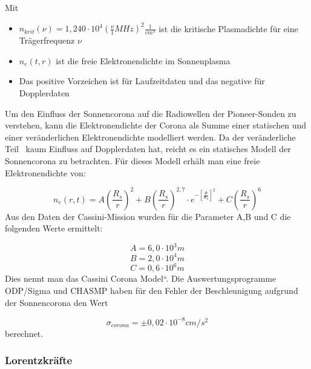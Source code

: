 Mit
\begin{itemize}
\item $n_{\mathit{krit}}(\nu )=1,240\cdot 10^{4}(\frac{\nu
}{1}\mathit{MHz})^{2}\frac{1}{\mathit{cm}^{3}}$ ist die kritische
Plasmadichte f\"ur eine Tr\"agerfrequenz $\nu $

\item $n_{e}(t,r)$ ist die freie Elektronendichte im Sonnenplasma
\item Das positive Vorzeichen ist f\"ur Laufzeitdaten und das negative
f\"ur Dopplerdaten
\end{itemize}

Um den Einfluss der Sonnencorona auf die Radiowellen der
Pioneer-Sonden zu verstehen, kann die Elektronendichte der Corona als
Summe einer statischen und einer ver\"anderlichen Elektronendichte
modelliert werden. Da der ver\"anderliche Teil \ kaum Einfluss auf
Dopplerdaten hat\cite{Anderson2002}, reicht es ein statisches Modell der Sonnencorona
zu betrachten. F\"ur dieses Modell erh\"alt man eine freie
Elektronendichte von\cite{Anderson2002}:

\begin{equation}
n_{e}(r,t)=A(\frac{R_{s}}{r})^{2}+B(\frac{R_{s}}{r})^{2,7}\cdot
e^{-[\frac{\Phi }{\Phi _{0}}]^{2}}+C(\frac{R_{s}}{r})^{6}
\end{equation}
Aus den Daten der Cassini-Mission wurden f\"ur die Parameter A,B und C die
folgenden Werte ermittelt:

\begin{equation*}
A=6,0\cdot 10^{3}m
\end{equation*}
\begin{equation*}
B=2,0\cdot 10^{4}m
\end{equation*}
\begin{equation*}
C=0,6\cdot 10^{6}m
\end{equation*}
Dies nennt man das {\quotedblbase}Cassini Corona Model``. Die
Auswertungsprogramme ODP/Sigma und CHASMP haben f\"ur den Fehler der Beschleunigung aufgrund der Sonnencorona den
Wert

\begin{equation}
\sigma _{\mathit{corona}}=\pm 0,02\cdot
10^{-8}\mathit{cm}/s^{2}
\end{equation}
berechnet\cite{Anderson2002}.


\bigskip

\subsubsection{Lorentzkr\"afte}

